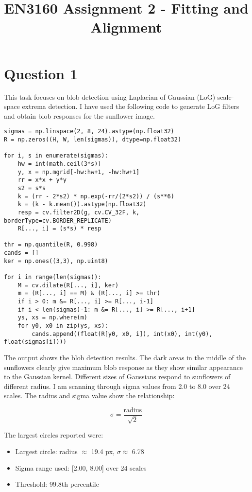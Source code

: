 \documentclass[11pt,a4paper]{article}
\title{EN3160 Assignment 2 - Fitting and Alignment}
\author{}
\date{}
\begin{document}
\maketitle

\section*{Question 1}

This task focuses on blob detection using Laplacian of Gaussian (LoG) scale-space extrema detection. I have used the following code to generate LoG filters and obtain blob responses for the sunflower image.

\begin{lstlisting}
sigmas = np.linspace(2, 8, 24).astype(np.float32)
R = np.zeros((H, W, len(sigmas)), dtype=np.float32)

for i, s in enumerate(sigmas):
    hw = int(math.ceil(3*s))
    y, x = np.mgrid[-hw:hw+1, -hw:hw+1]
    rr = x*x + y*y
    s2 = s*s
    k = (rr - 2*s2) * np.exp(-rr/(2*s2)) / (s**6)
    k = (k - k.mean()).astype(np.float32)
    resp = cv.filter2D(g, cv.CV_32F, k, borderType=cv.BORDER_REPLICATE)
    R[..., i] = (s*s) * resp

thr = np.quantile(R, 0.998)
cands = []
ker = np.ones((3,3), np.uint8)

for i in range(len(sigmas)):
    M = cv.dilate(R[..., i], ker)
    m = (R[..., i] == M) & (R[..., i] >= thr)
    if i > 0: m &= R[..., i] >= R[..., i-1]
    if i < len(sigmas)-1: m &= R[..., i] >= R[..., i+1]
    ys, xs = np.where(m)
    for y0, x0 in zip(ys, xs):
        cands.append((float(R[y0, x0, i]), int(x0), int(y0), float(sigmas[i])))
\end{lstlisting}

The output shows the blob detection results. The dark areas in the middle of the sunflowers clearly give maximum blob response as they show similar appearance to the Gaussian kernel. Different sizes of Gaussians respond to sunflowers of different radius. I am scanning through sigma values from 2.0 to 8.0 over 24 scales. The radius and sigma value show the relationship:

\[ \sigma = \frac{\text{radius}}{\sqrt{2}} \]

The largest circles reported were:
\begin{itemize}
    \item Largest circle: radius $\approx$ 19.4 px, $\sigma \approx$ 6.78
    \item Sigma range used: [2.00, 8.00] over 24 scales
    \item Threshold: 99.8th percentile
\end{itemize}
\end{document}
